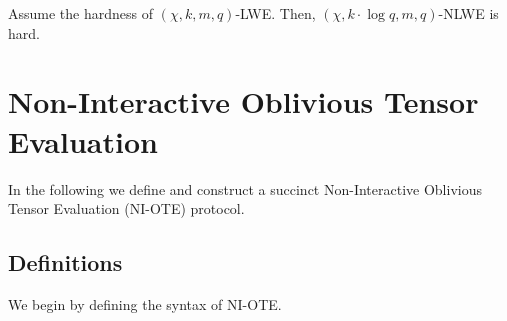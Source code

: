 \documentclass{theoretics}
\newcommand{\seclab}[1]{\label{sec:#1}}
\begin{document}
\begin{theorem}
    Assume the hardness of $(\chi, k, m, q)$-LWE. Then, $(\chi, k\cdot \log q, m, q)$-NLWE is hard.
\end{theorem}




\section{Non-Interactive Oblivious Tensor Evaluation}

In the following we define and construct a succinct Non-Interactive Oblivious Tensor Evaluation (NI-OTE) protocol.


\subsection{Definitions} \label{defOTE}

We begin by defining the syntax of NI-OTE.
\end{document}
